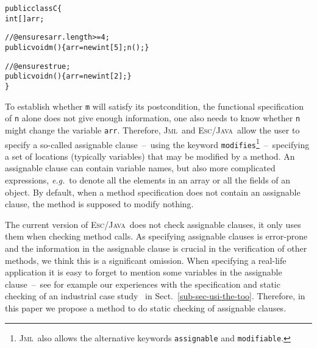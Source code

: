 \documentclass[a4paper]{llncs}
\newcommand{\jml}{\textsc{Jml}}
\newcommand{\escj}{\textsc{Esc/Java}}
\begin{document}
\begin{alltt}
public class C\verb!{!
  int[] arr;

  //@ ensures arr.length >= 4;
  public void m()\verb!{!arr = new int[5]; n();\verb!}!

  //@ ensures true;
  public void n()\verb!{!arr = new int[2];\verb!}!
\verb!}!
\end{alltt}
To establish whether \texttt{m} will satisfy its postcondition, the
functional specification of \texttt{n} alone does not give enough
information, one also needs to know whether \texttt{n} might change
the variable \texttt{arr}. Therefore, \jml\ and \escj\ allow the user
to specify a so-called assignable clause~--~using the keyword
\texttt{modifies}\footnote{\jml\ also allows the alternative keywords
\texttt{assignable} and \texttt{modifiable}.}~--~specifying a set of
locations (typically variables) that may be modified by a method. An
assignable clause can contain variable names, but also more
complicated expressions, \emph{e.g.}~to denote all the elements in an
array or all the fields of an object. By default, when a method
specification does not contain an assignable clause, the method is
supposed to modify nothing. %

The current version of \escj\ does not check assignable clauses, it
only uses them when checking method calls.  As specifying assignable
clauses is error-prone and the information in the assignable clause is
crucial in the verification of other methods, we think this is a
significant omission. When specifying a real-life application it is
easy to forget to mention some variables in the assignable
clause~--~see for example our experiences with the specification and
static checking of an industrial case study~\cite{CatanoH02a} in
Sect.~\ref{sub-sec-usi-the-too}. Therefore, in this paper we propose a
method to do static checking of assignable clauses.



\end{document}
